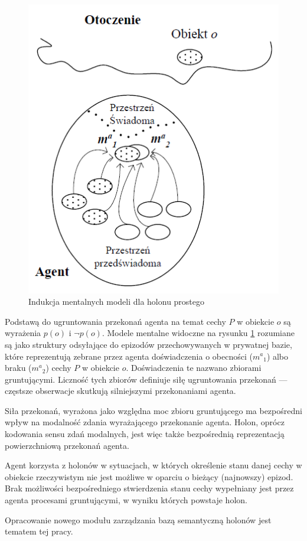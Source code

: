 \begin{figure}  
	\centering\includegraphics[width=.5\textwidth]{img/holon-modele-mentalne}
	\caption{Indukcja mentalnych modeli dla holonu prostego \cite{kat07}}
	\label{rys:holon}
\end{figure}

Podstawą do ugruntowania przekonań agenta na temat cechy $ P $ w obiekcie $ o $ są wyrażenia $ p(o) $ i $ \neg p(o) $. Modele mentalne widoczne na rysunku \ref{rys:holon} rozumiane są jako struktury odsyłające do epizodów przechowywanych w prywatnej bazie, które reprezentują zebrane przez agenta doświadczenia o obecności ($ m^a{}_1 $) albo braku ($ m^a{}_2 $) cechy $ P $ w obiekcie $ o $. Doświadczenia te nazwano zbiorami gruntującymi. Liczność tych zbiorów definiuje siłę ugruntowania przekonań --- częstsze obserwacje skutkują silniejszymi przekonaniami agenta. 

Siła przekonań, wyrażona jako względna moc zbioru gruntującego ma bezpośredni wpływ na modalność zdania wyrażającego przekonanie agenta. Holon, oprócz kodowania sensu zdań modalnych, jest więc także bezpośrednią reprezentacją powierzchniową przekonań agenta.

Agent korzysta z holonów w sytuacjach, w których określenie stanu danej cechy w obiekcie rzeczywistym nie jest możliwe w oparciu o bieżący (najnowszy) epizod. Brak możliwości bezpośredniego stwierdzenia stanu cechy wypełniany jest przez agenta procesami gruntującymi, w wyniku których powstaje holon.

Opracowanie nowego modułu zarządzania bazą semantyczną holonów jest tematem tej pracy.





